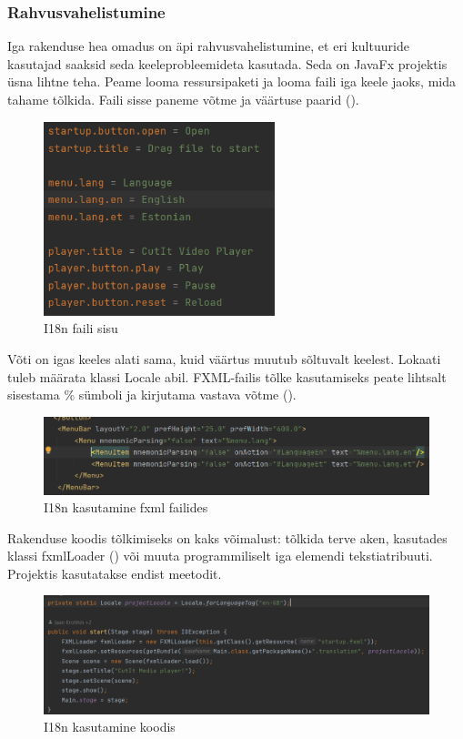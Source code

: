 \subsubsection{Rahvusvahelistumine}
Iga rakenduse hea omadus on äpi rahvusvahelistumine, et eri kultuuride kasutajad saaksid seda keeleprobleemideta kasutada. Seda on JavaFx projektis üsna lihtne teha. Peame looma ressursipaketi ja looma faili iga keele jaoks, mida tahame tõlkida. Faili sisse paneme võtme ja väärtuse paarid (). 
\begin{figure}[H]
    \centering
    \includegraphics[width=0.6\textwidth]{Images/i18n.png}
    \caption{I18n faili sisu}
    \label{fig:i18n_example}
\end{figure}
Võti on igas keeles alati sama, kuid väärtus muutub sõltuvalt keelest. Lokaati tuleb määrata klassi Locale abil. FXML-failis tõlke kasutamiseks peate lihtsalt sisestama \% sümboli ja kirjutama vastava võtme (). 
\begin{figure}[H]
    \centering
    \includegraphics[width=1\textwidth]{Images/i18n_fxml.png}
    \caption{I18n kasutamine fxml failides}
    \label{fig:i18n_fxml}
\end{figure}
Rakenduse koodis tõlkimiseks on kaks võimalust: tõlkida terve aken, kasutades klassi fxmlLoader () või muuta programmiliselt iga elemendi tekstiatribuuti. Projektis kasutatakse endist meetodit.
\begin{figure}[H]
    \centering
    \includegraphics[width=1\textwidth]{Images/i18n_code.png}
    \caption{I18n kasutamine koodis}
    \label{fig:i18n_code}
\end{figure}

